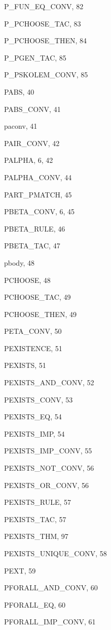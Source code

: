 \begin{theindex}
  \item {\ptt P\_FUN\_EQ\_CONV}, 82
  \item {\ptt P\_PCHOOSE\_TAC}, 83
  \item {\ptt P\_PCHOOSE\_THEN}, 84
  \item {\ptt P\_PGEN\_TAC}, 85
  \item {\ptt P\_PSKOLEM\_CONV}, 85
  \item {\ptt PABS}, 40
  \item {\ptt PABS\_CONV}, 41
  \item {\ptt paconv}, 41
  \item {\ptt PAIR\_CONV}, 42
  \item {\ptt PALPHA}, 6, 42
  \item {\ptt PALPHA\_CONV}, 44
  \item {\ptt PART\_PMATCH}, 45
  \item {\ptt PBETA\_CONV}, 6, 45
  \item {\ptt PBETA\_RULE}, 46
  \item {\ptt PBETA\_TAC}, 47
  \item {\ptt pbody}, 48
  \item {\ptt PCHOOSE}, 48
  \item {\ptt PCHOOSE\_TAC}, 49
  \item {\ptt PCHOOSE\_THEN}, 49
  \item {\ptt PETA\_CONV}, 50
  \item {\ptt PEXISTENCE}, 51
  \item {\ptt PEXISTS}, 51
  \item {\ptt PEXISTS\_AND\_CONV}, 52
  \item {\ptt PEXISTS\_CONV}, 53
  \item {\ptt PEXISTS\_EQ}, 54
  \item {\ptt PEXISTS\_IMP}, 54
  \item {\ptt PEXISTS\_IMP\_CONV}, 55
  \item {\ptt PEXISTS\_NOT\_CONV}, 56
  \item {\ptt PEXISTS\_OR\_CONV}, 56
  \item {\ptt PEXISTS\_RULE}, 57
  \item {\ptt PEXISTS\_TAC}, 57
  \item {\ptt PEXISTS\_THM}, 97
  \item {\ptt PEXISTS\_UNIQUE\_CONV}, 58
  \item {\ptt PEXT}, 59
  \item {\ptt PFORALL\_AND\_CONV}, 60
  \item {\ptt PFORALL\_EQ}, 60
  \item {\ptt PFORALL\_IMP\_CONV}, 61

\end{theindex}
